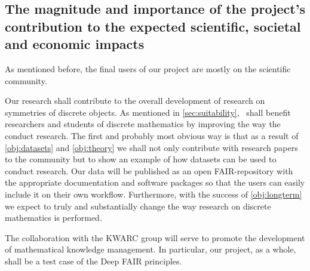 \subsection{The magnitude and importance of the project’s contribution to the expected scientific, societal and economic impacts}
\label{sec:impactmeasures}

As mentioned before, the final users of our project are mostly on the scientific community.

Our research shall contribute to the overall development of research on symmetries of discrete objects.
As mentioned in \cref{sec:suitability}, \ourp\ shall benefit researchers and students of discrete mathematics by improving the way the conduct research. The first and probably most obvious way is that as a result of \cref{obj:datasets} and \cref{obj:theory} we shall not only contribute with research papers to the community but to show an example of how datasets can be used to conduct research.
Our data will be published as an open FAIR-repository with the appropriate documentation and software packages so that the users can easily include it on their own workflow.
Furthermore, with the success of \cref{obj:longterm} we expect to truly and substantially change the way research on discrete mathematics is performed.

The collaboration with the KWARC group will serve to promote the development of mathematical knowledge management. In particular, our project, as a whole, shall be a test case of the Deep FAIR principles.


